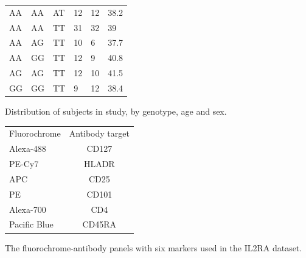 \begin{table}
\begin{tabular}{llllll}
AA & AA & AT & 12 & 12 & 38.2\\
AA & AA & TT & 31 & 32 & 39\\
AA & AG & TT & 10 & 6 & 37.7\\
AA & GG & TT & 12 & 9 & 40.8\\
AG & AG & TT & 12 & 10 & 41.5\\
GG & GG & TT & 9 & 12 & 38.4\\
\end{tabular}
{ Distribution of subjects in study, by genotype, age and sex.}
{
}
\vspace{1em}
\begin{tabular}{lc}
\rowcolor{Gray}
Fluorochrome  & Antibody target\\
Alexa-488    & CD127\\
PE-Cy7       & HLADR\\
APC          & CD25\\
PE           & CD101\\
Alexa-700    & CD4\\
Pacific Blue & CD45RA\\
\end{tabular}
{ The fluorochrome-antibody panels with six markers used in the IL2RA dataset.  }
{ }
\end{table}

